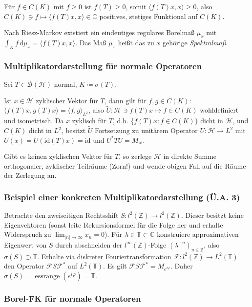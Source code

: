 \documentclass[11pt,a4paper]{scrartcl}
\newcommand{\Z}{\mathbb{Z}} %
\newcommand{\C}{\mathbb{C}} %
\newcommand{\Hc}{\mathcal{H}}
\newcommand{\B}{\mathcal{B}}
\newcommand{\F}{\mathcal{F}}
\theoremstyle{plain}
\theoremstyle{definition}
\theoremstyle{remark}
\DeclareMathOperator{\essrange}{ess range}
\begin{document}
Für $f\in C(K)$ mit $f \geq 0$ ist $f(T) \geq 0$, somit $\langle f(T)x, x \rangle \geq 0$, also $C(K)\ni f \mapsto \langle f(T)x,x \rangle \in \C$ positives, stetiges Funktional auf $C(K)$.

Nach Riesz-Markov existiert ein eindeutiges reguläres Borelmaß $\mu_x$ mit $\int_K f \,\mathrm{d}\mu_x = \langle f(T)x, x \rangle$. Das Maß $\mu_x$ heißt das zu $x$ gehörige \emph{Spektralmaß}.


\subsubsection{Multiplikatordarstellung für normale Operatoren}

Sei $T\in \B(\Hc)$ normal, $K\coloneqq \sigma(T)$. 

Ist $x\in \Hc$ zyklischer Vektor für $T$, dann gilt für $f,g\in C(K)$: $\langle f(T)x, g(T)x \rangle = \langle f,g\rangle_{L^2}$, also $\tilde U: \Hc\ni f(T)x \mapsto f \in C(K)$ wohldefiniert und isometrisch. Da $x$ zyklisch für $T$, d.h. $\{ f(T)x: f\in C(K) \}$ dicht in $\Hc$, und $C(K)$ dicht in $L^2$, besitzt $\tilde U$ Fortsetzung zu unitärem Operator $U: \Hc \to L^2$ mit $U(x)=U(\mathrm{id}(T)x)=\mathrm{id}$ und $U^*TU=M_\mathrm{id}$.

Gibt es keinen zyklischen Vektor für $T$, so zerlege $\Hc$ in direkte Summe orthogonaler, zyklischer Teilräume (Zorn!) und wende obigen Fall auf die Räume der Zerlegung an.

\subsubsection{Beispiel einer konkreten Multiplikatordarstellung (Ü.A. 3)}

Betrachte den zweiseitigen Rechtsshift $S: l^2(\Z) \to l^2(\Z)$. Dieser besitzt keine Eigenvektoren (sonst leite Rekursionsformel für die Folge her und erhalte Widerspruch zu $\lim_{|n|\to \infty} x_n = 0$). Für $\lambda \in \mathbb{T} \subset \C$ konstruiere approximativen Eigenwert von $S$ durch abschneiden der $l^\infty(\Z)$-Folge $(\lambda^{-n})_{n\in \Z}$, also $\sigma(S) \supset \mathbb{T}$. Erhalte via diskreter Fouriertransformation $\F: l^2(\Z) \to L^2(\mathbb T)$ den Operator $\F S\F^*$ auf $L^2(\mathbb T)$. Es gilt $\F S\F^*=M_{e^{i\varphi}}$. Daher $\sigma(S)=\essrange(e^{i\varphi})=\mathbb{T}$.

\subsubsection{Borel-FK für normale Operatoren}
\end{document}
